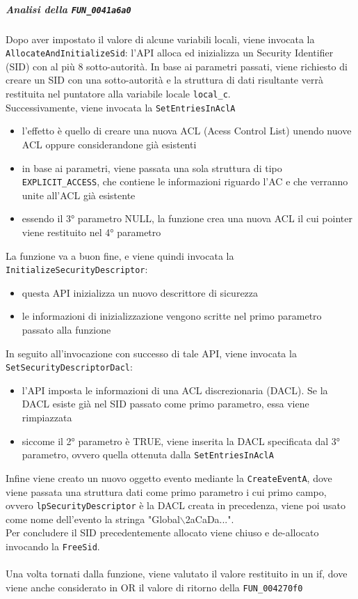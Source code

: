 \documentclass[12pt]{extarticle}
\begin{document}
\subparagraph{Analisi della \texttt{FUN\_0041a6a0}}
Dopo aver impostato il valore di alcune variabili locali, viene invocata la \texttt{AllocateAndInitializeSid}: l'API alloca ed inizializza un Security Identifier (SID) con al più 8 sotto-autorità. In base ai parametri passati, viene richiesto di creare un SID con una sotto-autorità e la struttura di dati risultante verrà restituita nel puntatore alla variabile locale \texttt{local\_c}.\\Successivamente, viene invocata la \texttt{SetEntriesInAclA}
\begin{itemize}
    \item l'effetto è quello di creare una nuova ACL (Acess Control List) unendo nuove ACL oppure considerandone già esistenti
    \item in base ai parametri, viene passata una sola struttura di tipo \texttt{EXPLICIT\_ACCESS}, che contiene le informazioni riguardo l'AC e che verranno unite all'ACL già esistente
    \item essendo il 3° parametro NULL, la funzione crea una nuova ACL il cui pointer viene restituito nel 4° parametro
\end{itemize}
La funzione va a buon fine, e viene quindi invocata la \texttt{InitializeSecurityDescriptor}:
\begin{itemize}
    \item questa API inizializza un nuovo descrittore di sicurezza
    \item le informazioni di inizializzazione vengono scritte nel primo parametro passato alla funzione 
\end{itemize}
In seguito all'invocazione con successo di tale API, viene invocata la \texttt{SetSecurityDescriptorDacl}:
\begin{itemize}
    \item l'API imposta le informazioni di una ACL discrezionaria (DACL). Se la DACL esiste già nel SID passato come primo parametro, essa viene rimpiazzata
    \item siccome il 2° parametro è TRUE, viene inserita la DACL specificata dal 3° parametro, ovvero quella ottenuta dalla \texttt{SetEntriesInAclA}
\end{itemize}
Infine viene creato un nuovo oggetto evento mediante la \texttt{CreateEventA}, dove viene passata una struttura dati come primo parametro i cui primo campo, ovvero \texttt{lpSecurityDescriptor} è la DACL creata in precedenza, viene poi usato come nome dell'evento la stringa "Global$\backslash$2aCaDa...".\\Per concludere il SID precedentemente allocato viene chiuso e de-allocato invocando la \texttt{FreeSid}.\\\\
Una volta tornati dalla funzione, viene valutato il valore restituito in un if, dove viene anche considerato in OR il valore di ritorno della \texttt{FUN\_004270f0}\\
\end{document}
